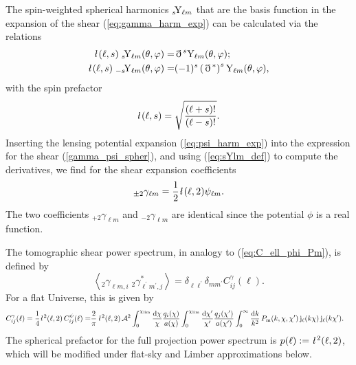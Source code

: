 \documentclass[fleqn,usenatbib]{mnras} %
\newcommand{\ellbar}{\hbox{\it \l}\,}
\newcommand{\pref}{{\cal A}}
\newcommand{\edth}{\,\eth\,}
\begin{document}
%
The spin-weighted spherical harmonics $_s\!{\rm Y}_{\ell m}$ that are the basis function
in the expansion of the shear (\ref{eq:gamma_harm_exp}) can be calculated via the relations
%
%
\begin{align}
  \ellbar(\ell, s) \; _s\!{\rm Y}_{\ell m}(\theta, \varphi) = & \edth^s {\rm Y}_{\ell m}(\theta, \varphi);
    \nonumber \\
  \ellbar(\ell, s) \; _{-s}\!{\rm Y}_{\ell m}(\theta, \varphi) = & (-1)^s \left(\edth^\ast\right)^s {\rm Y}_{\ell m}(\theta, \varphi),
  \label{eq:sYlm_def} 
\end{align}
%
with the spin prefactor \citep{2012PhRvD..86b3001B}
%
\begin{equation}
  \ellbar(\ell, s) = \sqrt{\frac{(\ell + s)!}{(\ell - s)!}}.
  \label{eq:ellbar}
\end{equation} 
%
Inserting the lensing potential expansion (\ref{eq:psi_harm_exp}) into the
expression for the shear (\ref{gamma_psi_spher}), and using (\ref{eq:sYlm_def})
to compute the derivatives, we find for the shear expansion coefficients
\citep{2000PhRvD..62d3007H,2001astro.ph.11605T}
%
%
\begin{equation}
  _{\pm 2} \gamma_{\ell m} = \frac 1 2 \ellbar(\ell, 2) \psi_{\ell m}.
  \label{eq:gamma_ellm_phi_ellm}
\end{equation}
%
The two coefficients $_{+2} \gamma_{\ell m}$ and $_{-2} \gamma_{\ell m}$ are
identical since the potential $\phi$ is a real function.

The tomographic shear power spectrum, in analogy to (\ref{eq:C_ell_phi_Pm}), is defined by
%
\begin{equation}
  \left\langle _2\gamma^{}_{\ell m, i} \; {}_2\gamma^\ast_{\ell^\prime m^\prime, j} \right\rangle
    = \delta_{\ell \ell^\prime} \delta_{m m^\prime} C^\gamma_{ij}(\ell).
  \label{eq:C_ell_gamma}
\end{equation}
%
For a flat Universe, this is given by
%
\begin{align}
  C^\gamma_{ij}(\ell) = \frac 1 4 \ellbar^2(\ell, 2) \, C^\psi_{ij}(\ell)
                 = & \frac 2 \pi \, \ellbar^2(\ell, 2) \, \pref^2
                 \int_{0}^{\chi_{\rm lim}} \frac{\rm d \chi}{\chi} \frac{q_i(\chi)}{a(\chi)}
                \int_{0}^{\chi_{\rm lim}} \frac{\rm d \chi^\prime}{\chi^\prime}
                \frac{q_j(\chi^\prime)}{a(\chi^\prime)}
                \int_0^\infty \frac{{\rm d} k}{k^2} \, P_{\rm m}(k, \chi, \chi^\prime) \,
                {\rm j}_\ell(k \chi) \, {\rm j}_\ell(k \chi^\prime) .
  \label{eq:C_ell_full}
\end{align}
%
The spherical prefactor for the full projection power spectrum is $p(\ell) :=
\ellbar^2(\ell, 2)$, which will be modified under flat-sky and Limber
approximations below.
\end{document}
